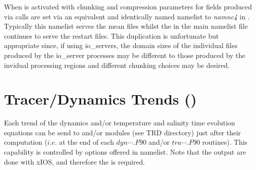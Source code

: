 \documentclass[NEMO_book]{subfiles}
\begin{document}
When  is activated with  chunking and
compression parameters for fields produced via  calls are
set via an equivalent and identically named namelist to \textit{namnc4} 
in . Typically this namelist serves the mean files
whilst the  in the main namelist file continues to serve the
restart files. This duplication is unfortunate but appropriate since, if
using io\_servers, the domain sizes of the individual files produced by the
io\_server processes may be different to those produced by the invidual
processing regions and different chunking choices may be desired.
 

\section[Tracer/Dynamics Trends (TRD)]
                  {Tracer/Dynamics Trends  ()}
\label{DIA_trd}


Each trend of the dynamics and/or temperature and salinity time evolution equations 
can be send to  and/or  modules (see TRD directory) just after their computation 
($i.e.$ at the end of each $dyn\cdots.F90$ and/or $tra\cdots.F90$ routines). 
This capability is controlled by options offered in  namelist. 
Note that the output are done with xIOS, and therefore the  is required.
\end{document}
